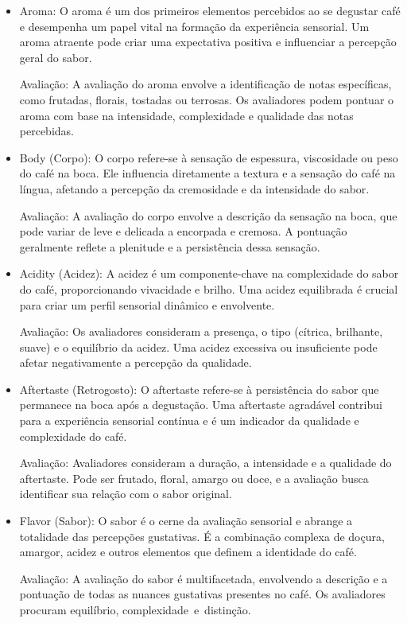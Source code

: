 \documentclass{article}
\begin{document}
\begin{itemize}
    \item Aroma:
    O aroma é um dos primeiros elementos percebidos ao se degustar café e desempenha um papel vital na formação da experiência sensorial. Um aroma atraente pode criar uma expectativa positiva e influenciar a percepção geral do sabor.
    
    Avaliação: A avaliação do aroma envolve a identificação de notas específicas, como frutadas, florais, tostadas ou terrosas. Os avaliadores podem pontuar o aroma com base na intensidade, complexidade e qualidade das notas percebidas.

    \item Body (Corpo): O corpo refere-se à sensação de espessura, viscosidade ou peso do café na boca. Ele influencia diretamente a textura e a sensação do café na língua, afetando a percepção da cremosidade e da intensidade do sabor.
    
    Avaliação: A avaliação do corpo envolve a descrição da sensação na boca, que pode variar de leve e delicada a encorpada e cremosa. A pontuação geralmente reflete a plenitude e a persistência dessa sensação.

    \item Acidity (Acidez): A acidez é um componente-chave na complexidade do sabor do café, proporcionando vivacidade e brilho. Uma acidez equilibrada é crucial para criar um perfil sensorial dinâmico e envolvente.
    
    Avaliação: Os avaliadores consideram a presença, o tipo (cítrica, brilhante, suave) e o equilíbrio da acidez. Uma acidez excessiva ou insuficiente pode afetar negativamente a percepção da qualidade.

    \item Aftertaste (Retrogosto): O aftertaste refere-se à persistência do sabor que permanece na boca após a degustação. Uma aftertaste agradável contribui para a experiência sensorial contínua e é um indicador da qualidade e complexidade do café.
    
    Avaliação: Avaliadores consideram a duração, a intensidade e a qualidade do aftertaste. Pode ser frutado, floral, amargo ou doce, e a avaliação busca identificar sua relação com o sabor original.

    \item Flavor (Sabor): O sabor é o cerne da avaliação sensorial e abrange a totalidade das percepções gustativas. É a combinação complexa de doçura, amargor, acidez e outros elementos que definem a identidade do café.
    
    Avaliação: A avaliação do sabor é multifacetada, envolvendo a descrição e a pontuação de todas as nuances gustativas presentes no café. Os avaliadores procuram equilíbrio, complexidade e distinção.
\end{itemize}
\end{document}
